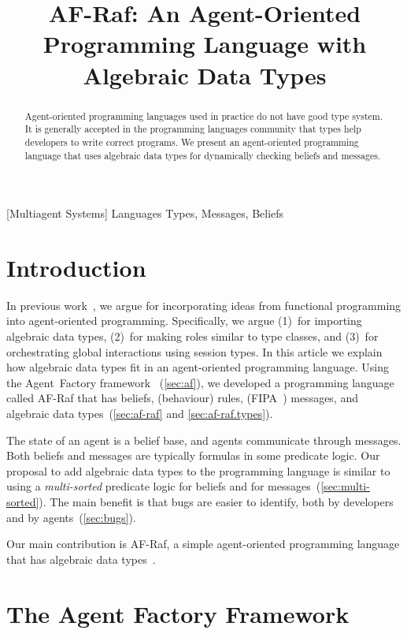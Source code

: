 \documentclass[preprint]{sigplanconf} %
\title{
  AF-Raf: An Agent-Oriented Programming Language with Algebraic Data Types}
\theoremstyle{remark}
\begin{document}
\maketitle
\begin{abstract} %
Agent-oriented programming languages used in practice do not have good type
system. It is generally accepted in the programming languages community
that types help developers to write correct programs. We present an
agent-oriented programming language that uses algebraic data types for
dynamically checking beliefs and messages.
\end{abstract} %
[Multiagent Systems]
\terms Languages
\keywords Types, Messages, Beliefs

\section{Introduction} %

In previous work~\cite{grigore2011}, we argue for incorporating ideas from
functional programming into agent-oriented programming. Specifically, we
argue (1)~for importing algebraic data types, (2)~for making roles similar
to type classes, and (3)~for orchestrating global interactions using
session types. In this article we explain how algebraic data types fit in
an agent-oriented programming language. Using the Agent~Factory
framework~\cite{russell2011af} (\autoref{sec:af}), we developed a
programming language called AF-Raf that has beliefs, (behaviour) rules,
(FIPA~\cite{poslad2000fipa}) messages, and algebraic data
types~(\autoref{sec:af-raf} and \autoref{sec:af-raf.types}).

The state of an agent is a belief base, and agents communicate through
messages. Both beliefs and messages are typically formulas in some
predicate logic. Our proposal to add algebraic data types to the
programming language is similar to using a \emph{multi-sorted} predicate
logic for beliefs and for messages~(\autoref{sec:multi-sorted}). The main
benefit is that bugs are easier to identify, both by developers and by
agents~(\autoref{sec:bugs}).

Our main contribution is AF-Raf, a simple agent-oriented programming
language that has algebraic data types~\cite{site:af-raf}.

\section{The Agent Factory Framework} \label{sec:af} %
\end{document}
